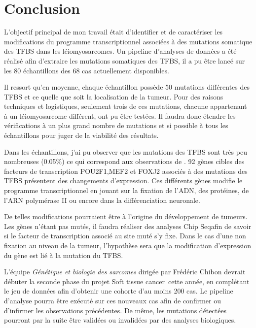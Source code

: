 \chapter*{Conclusion}

L'objectif principal de mon travail était d'identifier et de caractériser les modifications du programme transcriptionnel associées à des mutations somatique des TFBS dans les léiomyosarcomes. Un pipeline d'analyses de données a été réalisé afin d'extraire les mutations somatiques des TFBS, il a pu être lancé sur les 80 échantillons des 68 cas actuellement disponibles. 

Il ressort qu'en moyenne, chaque échantillon possède 50 mutations différentes des TFBS et ce quelle que soit la localisation de la tumeur. Pour des raisons techniques et logistiques, seulement trois de ces mutations, chacune appartenant à un léiomyosarcome différent, ont pu être testées. Il faudra donc étendre les vérifications à un plus grand nombre de mutations et si possible à tous les échantillons pour juger de la viabilité des résultats. 

Dans les échantillons, j'ai pu observer que les mutations des TFBS sont très peu nombreuses (0.05\%) ce qui correspond aux observations de \citeauthor{Melton}. 92 gènes cibles des facteurs de transcription POU2F1,MEF2 et FOXJ2 associés à des mutations des TFBS présentent des changements d'expression. Ces différents gènes modifie le programme transcriptionnel en jouant sur la fixation de l'ADN, des protéines, de l'ARN polymérase II ou encore dans la différenciation neuronale. 

De telles modifications pourraient être à l'origine du développement de tumeurs. Les gènes n'étant pas mutés, il faudra réaliser des analyses \og Chip Seq\fg afin de savoir si le facteur de transcription associé au site muté s'y fixe. Dans le cas d'une non fixation au niveau de la tumeur, l'hypothèse sera que la modification d'expression du gène est lié à la mutation du TFBS. 

L'équipe \textit{Génétique et biologie des sarcomes} dirigée par Frédéric Chibon devrait débuter la seconde phase du projet \og Soft tissue cancer\fg ~cette année, en complétant le jeu de données afin d'obtenir une cohorte d'au moins 200 cas. Le pipeline d'analyse pourra être exécuté sur ces nouveaux cas afin de confirmer ou d'infirmer les observations précédentes. De même, les mutations détectées pourront par la suite être validées ou invalidées par des analyses biologiques.

